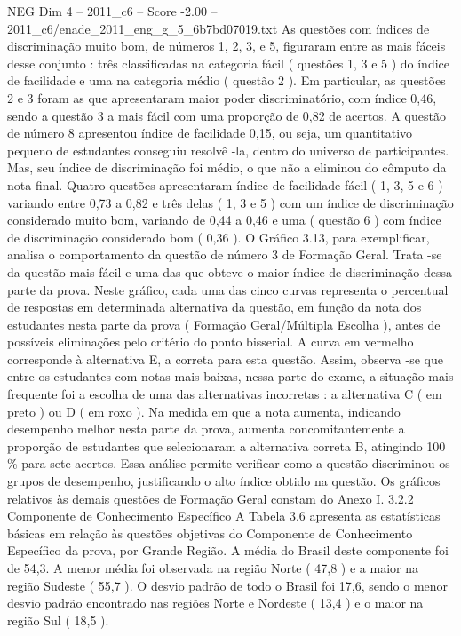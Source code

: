 \begin{textsample}{NEG Dim 4 – 2011\_c6 – Score -2.00 – 2011\_c6/enade\_2011\_eng\_g\_5\_6b7bd07019.txt}
As questões com índices de discriminação muito bom, de números 1, 2, 3, e 5, figuraram entre as mais fáceis desse conjunto : três classificadas na categoria fácil ( questões 1, 3 e 5 ) do índice de facilidade e uma na categoria médio ( questão 2 ).
Em particular, as questões 2 e 3 foram as que apresentaram maior poder discriminatório, com índice 0,46, sendo a questão 3 a mais fácil com uma proporção de 0,82 de acertos.
A questão de número 8 apresentou índice de facilidade 0,15, ou seja, um quantitativo pequeno de estudantes conseguiu resolvê -la, dentro do universo de participantes.
Mas, seu índice de discriminação foi médio, o que não a eliminou do cômputo da nota final.
Quatro questões apresentaram índice de facilidade fácil ( 1, 3, 5 e 6 ) variando entre 0,73 a 0,82 e três delas ( 1, 3 e 5 ) com um índice de discriminação considerado muito bom, variando de 0,44 a 0,46 e uma ( questão 6 ) com índice de discriminação considerado bom ( 0,36 ).
O Gráfico 3.13, para exemplificar, analisa o comportamento da questão de número 3 de Formação Geral.
Trata -se da questão mais fácil e uma das que obteve o maior índice de discriminação dessa parte da prova.
Neste gráfico, cada uma das cinco curvas representa o percentual de respostas em determinada alternativa da questão, em função da nota dos estudantes nesta parte da prova ( Formação Geral/Múltipla Escolha ), antes de possíveis eliminações pelo critério do ponto bisserial.
A curva em vermelho corresponde à alternativa E, a correta para esta questão.
Assim, observa -se que entre os estudantes com notas mais baixas, nessa parte do exame, a situação mais frequente foi a escolha de uma das alternativas incorretas : a alternativa C ( em preto ) ou D ( em roxo ).
Na medida em que a nota aumenta, indicando desempenho melhor nesta parte da prova, aumenta concomitantemente a proporção de estudantes que selecionaram a alternativa correta B, atingindo 100 \% para sete acertos.
Essa análise permite verificar como a questão discriminou os grupos de desempenho, justificando o alto índice obtido na questão.
Os gráficos relativos às demais questões de Formação Geral constam do Anexo I. 3.2.2 Componente de Conhecimento Específico A Tabela 3.6 apresenta as estatísticas básicas em relação às questões objetivas do Componente de Conhecimento Específico da prova, por Grande Região.
A média do Brasil deste componente foi de 54,3.
A menor média foi observada na região Norte ( 47,8 ) e a maior na região Sudeste ( 55,7 ).
O desvio padrão de todo o Brasil foi 17,6, sendo o menor desvio padrão encontrado nas regiões Norte e Nordeste ( 13,4 ) e o maior na região Sul ( 18,5 ).

\end{textsample}
